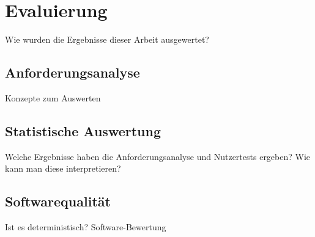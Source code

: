 \chapter{Evaluierung} %
Wie wurden die Ergebnisse dieser Arbeit ausgewertet?

\section{Anforderungsanalyse} %
Konzepte zum Auswerten 

\section{Statistische Auswertung} %
Welche Ergebnisse haben die Anforderungsanalyse und Nutzertests ergeben? Wie kann man diese interpretieren? 

\section{Softwarequalität}
Ist es deterministisch? Software-Bewertung